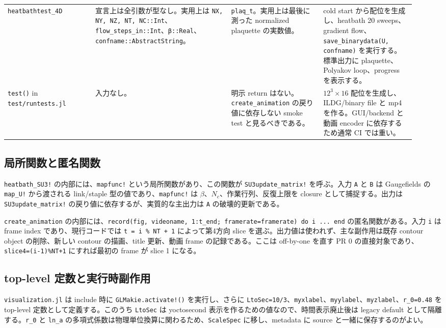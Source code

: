 \documentclass[uplatex,dvipdfmx,ja=standard,11pt,a4paper]{bxjsarticle}
\newcommand{\code}[1]{\texttt{#1}}
\begin{document}
{\begin{longtable}{>{\raggedright\arraybackslash}p{0.20\linewidth}>{\raggedright\arraybackslash}p{0.31\linewidth}>{\raggedright\arraybackslash}p{0.21\linewidth}>{\raggedright\arraybackslash}p{0.21\linewidth}}
\code{heatbathtest\_4D} & 宣言上は全引数が型なし。実用上は \code{NX, NY, NZ, NT, NC::Int}、\code{flow\_steps\_in::Int}、\code{β::Real}、\code{confname::AbstractString}。 & \code{plaq\_t}。実用上は最後に測った normalized plaquette の実数値。 & cold start から配位を生成し、heatbath 20 sweeps、gradient flow、\code{save\_binarydata(U, confname)} を実行する。標準出力に plaquette、Polyakov loop、progress を表示する。 \\
\code{test()} in \code{test/runtests.jl} & 入力なし。 & 明示 return はない。\code{create\_animation} の戻り値に依存しない smoke test と見るべきである。 & \(12^3\times16\) 配位を生成し、ILDG/binary file と mp4 を作る。GUI/backend と動画 encoder に依存するため通常 CI では重い。 \\
\bottomrule
\end{longtable}
}

\subsection{局所関数と匿名関数}
\code{heatbath\_SU3!} の内部には、\code{mapfunc!} という局所関数があり、この関数が \code{SU3update\_matrix!} を呼ぶ\cite{VisualizingConfig}。入力 \code{A} と \code{B} は Gaugefields の \code{map\_U!} から渡される link/staple 型の値であり、\code{mapfunc!} は \(\beta\)、\(N_c\)、作業行列、反復上限を closure として捕捉する。出力は \code{SU3update\_matrix!} の戻り値に依存するが、実質的な主出力は \code{A} の破壊的更新である。

\code{create\_animation} の内部には、\code{record(fig, videoname, 1:t\_end; framerate=framerate) do i ... end} の匿名関数がある\cite{VisualizingVisualization}。入力 \code{i} は frame index であり、現行コードでは \code{t = i \% NT + 1} によって第4方向 slice を選ぶ。出力値は使われず、主な副作用は既存 contour object の削除、新しい contour の描画、title 更新、動画 frame の記録である。ここは off-by-one を直す PR 0 の直接対象であり、\code{slice4=(i-1)\%NT+1} にすれば最初の frame が slice 1 になる。

\subsection{top-level 定数と実行時副作用}
\code{visualization.jl} は include 時に \code{GLMakie.activate!()} を実行し、さらに \code{LtoSec=10/3}、\code{myxlabel}、\code{myylabel}、\code{myzlabel}、\code{r\_0=0.48} を top-level 定数として定義する\cite{VisualizingVisualization}。このうち \code{LtoSec} は yoctosecond 表示を作るための値なので、時間表示廃止後は legacy default として隔離する。\code{r\_0} と \code{ln\_a} の多項式係数は物理単位換算に関わるため、\code{ScaleSpec} に移し、metadata に source と一緒に保存するのがよい。
\end{document}
